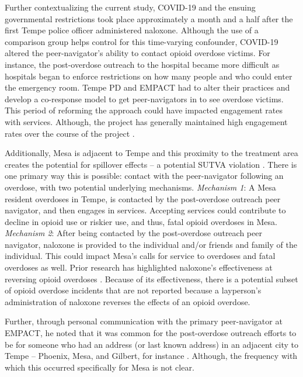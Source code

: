Further contextualizing the current study, COVID-19 and the ensuing governmental restrictions took place approximately a month and a half after the first Tempe police officer administered naloxone. Although the use of a comparison group helps control for this time-varying confounder, COVID-19 altered the peer-navigator's ability to contact opioid overdose victims. For instance, the post-overdose outreach to the hospital became more difficult as hospitals began to enforce restrictions on how many people and who could enter the emergency room. Tempe PD and EMPACT had to alter their practices and develop a co-response model to get peer-navigators in to see overdose victims. This period of reforming the approach could have impacted engagement rates with services. Although, the project has generally maintained high engagement rates over the course of the project \parencite{watts_tempe_2023}.

Additionally, Mesa is adjacent to Tempe and this proximity to the treatment area creates the potential for spillover effects -- a potential SUTVA violation \parencite{rubin_formal_1990}. There is one primary way this is possible: contact with the peer-navigator following an overdose, with two potential underlying mechanisms. \textit{Mechanism 1}: A Mesa resident overdoses in Tempe, is contacted by the post-overdose outreach peer navigator, and then engages in services. Accepting services could contribute to decline in opioid use or riskier use, and thus, fatal opioid overdoses in Mesa. \textit{Mechanism 2}: After being contacted by the post-overdose outreach peer navigator, naloxone is provided to the individual and/or friends and family of the individual. This could impact Mesa's calls for service to overdoses and fatal overdoses as well. Prior research has highlighted naloxone's effectiveness at reversing opioid overdoses \parencite{giglio_effectiveness_2015}. Because of its effectiveness, there is a potential subset of opioid overdose incidents that are not reported because a layperson's administration of naloxone reverses the effects of an opioid overdose. 

Further, through personal communication with the primary peer-navigator at EMPACT, he noted that it was common for the post-overdose outreach efforts to be for someone who had an address (or last known address) in an adjacent city to Tempe -- Phoenix, Mesa, and Gilbert, for instance \parencite{watts_personal_2024}. Although, the frequency with which this occurred specifically for Mesa is not clear.


